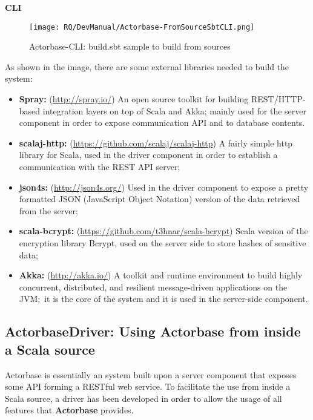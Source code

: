 \documentclass{scalatekids-article}
\begin{document}
\textbf{CLI}

\begin{figure}[H]
  \begin{center}
    \texttt{[image: RQ/DevManual/Actorbase-FromSourceSbtCLI.png]}
    \caption{Actorbase-CLI: build.sbt sample to build from sources}
  \end{center}
\end{figure}

As shown in the image, there are some external libraries needed to build the system:
\begin{itemize}
\item \textbf{Spray:} (\url{http://spray.io/}) An open source toolkit for building REST/HTTP-based
  integration layers on top of Scala and Akka; mainly used for the server
  component in order to expose communication API and to
   database contents.
\item \textbf{scalaj-http:} (\url{https://github.com/scalaj/scalaj-http}) A fairly simple http library for Scala, used in the
  driver component in order to establish a communication with the REST API server;\
\item \textbf{json4s:} (\url{http://json4s.org/}) Used in the driver component to expose a pretty formatted
  JSON (JavaScript Object Notation) version of the data retrieved from the server;
\item \textbf{scala-bcrypt:} (\url{https://github.com/t3hnar/scala-bcrypt}) Scala version of the encryption library Bcrypt,
  used on the server side to store hashes of sensitive data;
\item \textbf{Akka:} (\url{http://akka.io/}) A toolkit and runtime environment to build highly concurrent,
  distributed, and resilient message-driven applications on the JVM;\ it is the core of
  the system and it is used in the server-side component.
\end{itemize}


\subsection{ActorbaseDriver: Using Actorbase from inside a Scala source}

Actorbase is essentially an  system built upon a server component
that exposes some API forming a RESTful web service. To facilitate the use from
inside a Scala source, a driver has been developed in order to allow the
usage of all features that \textbf{Actorbase} provides.\\
\end{document}
